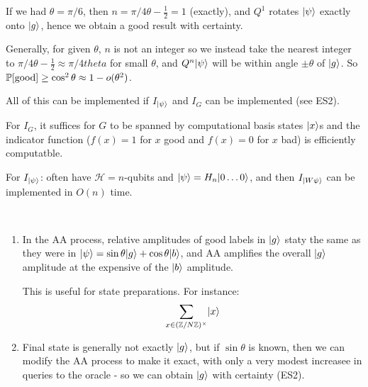 \documentclass[]{article}
\begin{document}
\begin{remark*}[Example]
If we had $\theta = \pi/6$, then $n = \pi/4\theta - \frac{1}{2} = 1$ (exactly), and $Q^1$ rotates $\ket{\psi}$ exactly onto $\ket{g}$, hence we obtain a good result with certainty.
\end{remark*}

Generally, for given $\theta$, $n$ is not an integer so we instead take the nearest integer to $\pi/4\theta - \frac{1}{2} \approx \pi/4theta$ for small $\theta$, and $Q^n\ket{\psi}$ will be within angle $\pm \theta$ of $\ket{g}$. So $\P[\textrm{good}]\ge \cos^2\theta \approx 1 - o(\theta^2)$.

All of this can be implemented if $I_{\ket{\psi}}$ and $I_{G}$ can be implemented (see ES2).

For $I_G$, it suffices for $G$ to be spanned by computational basis states $\ket{x}$s and the indicator function ($f(x) = 1$ for $x$ good and $f(x) = 0$ for $x$ bad) is efficiently computatble.

For $I_{\ket{\psi}}$: often have $\mathcal{H} = n$-qubits and $\ket{\psi} = H_n\ket{0\dots 0}$, and then $I_{\ket{W\psi}}$ can be implemented in $O(n)$ time.

\begin{remark*}[Notes]\ 
	\begin{enumerate}
		\item In the AA process, relative amplitudes of good labels in $\ket{g}$ staty the same as they were in $\ket{\psi} = \sin\theta\ket{g} + \cos\theta \ket{b}$, and AA amplifies the overall $\ket{g}$ amplitude at the expensive of the $\ket{b}$ amplitude.
	
		This is useful for state preparations. For instance:
		\begin{align*}
			\sum_{x\in (\Z/N\Z)^\times}\ket{x}
		\end{align*}

		\item Final state is generally not exactly $\ket{g}$, but if $\sin\theta$ is known, then we can modify the AA process to make it exact, with only a very modest increasee in queries to the oracle - so we can obtain $\ket{g}$ with certainty (ES2).
	\end{enumerate}
\end{remark*}
\end{document}
